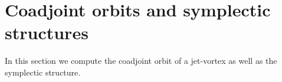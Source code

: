 \documentclass[12pt]{amsart}
\begin{document}


\section{Coadjoint orbits and symplectic structures}
\label{sec:orbits}

In this section we compute the coadjoint orbit of a jet-vortex
as well as the symplectic structure.
\end{document}
